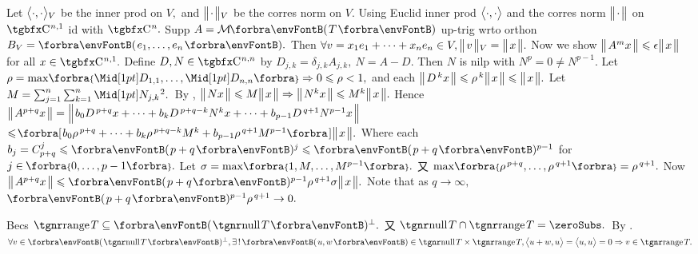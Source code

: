 Let $\big\langle{}\cdot,\cdot{}\big\rangle{_V}$ be the inner prod on $V,$ and $\big\Vert\hspace{1pt}{}{\cdot}{}\hspace{1pt}\big\Vert{_V}$ be the corres norm on $V.$\parSol{}
Using Euclid inner prod $\big\langle{}\cdot,\cdot{}\big\rangle$ and the corres norm $\big\Vert\hspace{1pt}{}{\cdot}{}\hspace{1pt}\big\Vert$ on $\CbbP{n,1}$ id with $\CbbP{n}.$\parSol{}
Supp $A=\Mt{T}$ up-trig wrto orthon $B_V=\Par{e_1,\dots,e_n}.$\parSol{}
Then $\forall v=x_1e_1+\dots+x_ne_n\in V,\big\Vert\hspace{1pt}{}v{}\hspace{1pt}\big\Vert{_V}=\big\Vert\hspace{1pt}{}x{}\hspace{1pt}\big\Vert.$ Now we show $\big\Vert\hspace{1pt}{}A^mx{}\hspace{1pt}\big\Vert\leqslant\epsilon\big\Vert\hspace{1pt}{}x{}\hspace{1pt}\big\Vert$ for all $x\in\CbbP{n,1}.$\parSol{}
Define $D,N\in\CbbP{n,n}$ by $D_{j,k}=\delta_{j,k}A_{j,k},\:N=A-D.$ Then $N$ is nilp with $N^p=0\neq N^{p-1}.$\parSol{}
Let $\rho=\max\!\Bra{\aMid{D_{1,1}},\dots,\aMid{D_{n,n}}}\Rightarrow0\leqslant\rho<1,$ and each $\big\Vert\hspace{1pt}{}D^{\,k}x{}\hspace{1pt}\big\Vert\leqslant\rho^{\,k}\big\Vert\hspace{1pt}{}x{}\hspace{1pt}\big\Vert\leqslant\big\Vert\hspace{1pt}{}x{}\hspace{1pt}\big\Vert.$\vspace{3pt}\parSol{}
Let $M=\sum_{j=1}^n\sum_{k=1}^n\aMidsq{N_{j,k}}.$ \,{By }, $\big\Vert\hspace{1pt}{}Nx{}\hspace{1pt}\big\Vert\leqslant M\big\Vert\hspace{1pt}{}x{}\hspace{1pt}\big\Vert\Rightarrow\big\Vert\hspace{1pt}{}N^{k}x{}\hspace{1pt}\big\Vert\leqslant M^k\big\Vert\hspace{1pt}{}x{}\hspace{1pt}\big\Vert.$\vspace{5pt}\parSol{}
Hence $\big\Vert\hspace{1pt}{}A^{p+q}x{}\hspace{1pt}\big\Vert=\Big\Vert\hspace{1pt}{}b_0D^{\,p+q}x+\dots+b_kD^{\,p+q-k}N^{k}x+\dots+b_{p-1}D^{\,q+1}N^{p-1}x{}\hspace{1pt}\Big\Vert$\vspace{3pt}\parSol{}
$\leqslant\!\BigSbra{{b_0\rho^{\,p+q}+\dots+b_k\rho^{\,p+q-k}M^k+b_{p-1}\rho^{\,q+1}M^{p-1}}}\Dvert{x}.$\vspace{4pt}\parSol{}
Where each $b_j=\mathC_{p+q}^j\leqslant\Par{p+q}{^j}\leqslant\Par{p+q}{^{p-1}}$ for $j\in\;\!\!\Bra{0,\dots,p-1}.$\vspace{1pt}\parSol{}
Let $\sigma=\max\!\Bra{1,M,\dots,M^{p-1}}.$ 又 $\max\!\Bra{\rho^{\,p+q},\dots,\rho^{\,q+1}}=\rho^{\,q+1}.$\parSol{}
Now $\Dvert{A^{p+q}x}\leqslant\Par{p+q}{^{p-1}}\rho^{\,q+1}\sigma\Dvert{x}.$ \;Note that as $q\rightarrow\infty,$ \,$\Par{p+q}{^{p-1}}\rho^{\,q+1}\rightarrow0.$\PfEnd
\SepLine
\ChEnd


\vspace{4pt}

Becs $\range T\subseteq\Par{\null T}{^\perp}.$ 又 $\null T\cap\range T=\zeroSubs.$ \,By .\PfEnd\parSol{}
\Or $\forall v\in\Par{\null T}{^\perp},\exists\,!\,\Par{u,w}\in\null T\times\range T,\Ang{u+w,u}=\Ang{u,u}=0\Rightarrow v\in\range T.$\PfEnd
\SepLine

